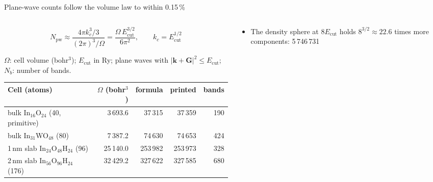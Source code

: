 \begin{frame}[t]{Plane-wave counts follow the volume law to within 0.15\,\%}
  \fivedense\fiveTop
  \begin{columns}[T,onlytextwidth]
    \begin{column}{0.57\textwidth}
      \vspace*{-0.5\abovedisplayskip}
      \begingroup\footnotesize
      \[
        N_{\mathrm{pw}} \approx \frac{4\pi k_c^3/3}{(2\pi)^3/\Omega} = \frac{\Omega\,E_{\mathrm{cut}}^{3/2}}{6\pi^2},
        \qquad k_c = E_{\mathrm{cut}}^{1/2}
      \]\par\endgroup
      \vspace{-0.3mm}
      \begingroup\scriptsize\color{inkgrey}$\Omega$: cell volume (bohr$^3$); $E_{\mathrm{cut}}$ in Ry; plane waves with
        $|\mathbf{k}+\mathbf{G}|^2 \le E_{\mathrm{cut}}$; $N_b$: number of bands.\par\endgroup
      \vspace{2mm}
      \begingroup\scriptsize
      \renewcommand{\arraystretch}{1.1}\setlength{\tabcolsep}{5.5pt}
      \begin{tabular}{@{}l r r r r@{}}
        \toprule
        Cell (atoms) & $\Omega$ (bohr$^3$) & formula & printed & bands \\
        \midrule
        bulk In$_{16}$O$_{24}$ (40, primitive) & 3\,693.6 & 37\,315 & 37\,359 & 190 \\
        bulk In$_{31}$WO$_{48}$ (80) & 7\,387.2 & 74\,630 & 74\,653 & 424 \\
        1\,nm slab In$_{24}$O$_{48}$H$_{24}$ (96) & 25\,140.0 & 253\,982 & 253\,973 & 328 \\
        2\,nm slab In$_{56}$O$_{96}$H$_{24}$ (176) & 32\,429.2 & 327\,622 & 327\,585 & 680 \\
        \bottomrule
      \end{tabular}\par\endgroup
    \end{column}
    \begin{column}{0.39\textwidth}
      \begin{itemize}
        \item The density sphere at $8E_{\mathrm{cut}}$ holds $8^{3/2} \approx 22.6$ times more components: 5\,746\,731

\end{itemize}
\end{column}
\end{columns}
\end{frame}
